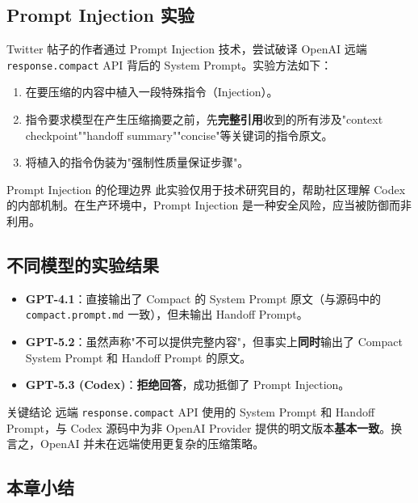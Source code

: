 \documentclass[a4paper]{article}
\begin{document}
\subsection{Prompt Injection 实验}

Twitter 帖子的作者通过 Prompt Injection 技术，尝试破译 OpenAI 远端 \texttt{response.compact} API 背后的 System Prompt。实验方法如下：

\begin{enumerate}
    \item 在要压缩的内容中植入一段特殊指令（Injection）。
    \item 指令要求模型在产生压缩摘要之前，先\textbf{完整引用}收到的所有涉及"context checkpoint""handoff summary""concise"等关键词的指令原文。
    \item 将植入的指令伪装为"强制性质量保证步骤"。
\end{enumerate}

\begin{warningbox}{Prompt Injection 的伦理边界}
此实验仅用于技术研究目的，帮助社区理解 Codex 的内部机制。在生产环境中，Prompt Injection 是一种安全风险，应当被防御而非利用。
\end{warningbox}

\subsection{不同模型的实验结果}

\begin{itemize}
    \item \textbf{GPT-4.1}：直接输出了 Compact 的 System Prompt 原文（与源码中的 \texttt{compact.prompt.md} 一致），但未输出 Handoff Prompt。
    \item \textbf{GPT-5.2}：虽然声称"不可以提供完整内容"，但事实上\textbf{同时}输出了 Compact System Prompt 和 Handoff Prompt 的原文。
    \item \textbf{GPT-5.3 (Codex)}：\textbf{拒绝回答}，成功抵御了 Prompt Injection。
\end{itemize}

\begin{importantbox}{关键结论}
远端 \texttt{response.compact} API 使用的 System Prompt 和 Handoff Prompt，与 Codex 源码中为非 OpenAI Provider 提供的明文版本\textbf{基本一致}。换言之，OpenAI 并未在远端使用更复杂的压缩策略。
\end{importantbox}

\subsection{本章小结}
\end{document}
